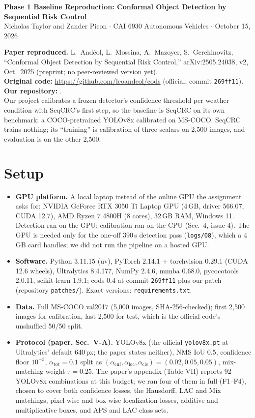 \documentclass[10pt]{article}
\begin{document}
\begin{center}
{\large\bfseries Phase 1 Baseline Reproduction: Conformal Object Detection by Sequential Risk Control}\\[1pt]
Nicholas Taylor and Zander Picon \;$\cdot$\; CAI 6930 Autonomous Vehicles \;$\cdot$\; October 15, 2026
\end{center}
\vspace{-6pt}
\textbf{Paper reproduced.} L.~And\'eol, L.~Mossina, A.~Mazoyer, S.~Gerchinovitz, ``Conformal Object Detection by
Sequential Risk Control,'' arXiv:2505.24038, v2, Oct.\ 2025 (preprint; no peer-reviewed version yet).\\
\textbf{Original code:} \url{https://github.com/leoandeol/cods} (official; commit \texttt{269ff11}).
\textbf{Our repository:} \repourl.\\
Our project calibrates a frozen detector's confidence threshold per weather condition with SeqCRC's first step, so
the baseline is SeqCRC on its own benchmark: a COCO-pretrained YOLOv8x calibrated on MS-COCO. SeqCRC trains nothing;
its ``training'' is calibration of three scalars on 2,500 images, and evaluation is on the other 2,500.

\section{Setup}
\begin{itemize}
\item \textbf{GPU platform.} A local laptop instead of the online GPU the assignment asks for: NVIDIA GeForce RTX 3050 Ti Laptop GPU (4\,GB,
driver 566.07, CUDA 12.7), AMD Ryzen 7 4800H (8 cores), 32\,GB RAM, Windows 11. Detection ran on the GPU; calibration
ran on the CPU (Sec.~4, issue 4). The GPU is needed only for the one-off 390\,s detection pass (\texttt{logs/08}), which a
4\,GB card handles; we did not run the pipeline on a hosted GPU.
\item \textbf{Software.} Python 3.11.15 (uv), PyTorch 2.14.1 + torchvision 0.29.1 (CUDA 12.6 wheels), Ultralytics
8.4.177, NumPy 2.4.6, numba 0.68.0, pycocotools 2.0.11, scikit-learn 1.9.1; cods 0.4 at commit \texttt{269ff11} plus
our patch (repository \texttt{patches/}). Exact versions: \texttt{requirements.txt}.
\item \textbf{Data.} Full MS-COCO val2017 (5,000 images, SHA-256-checked); first 2,500 images for calibration,
last 2,500 for test, which is the official code's unshuffled 50/50 split.
\item \textbf{Protocol (paper, Sec.~V-A).} YOLOv8x (the official \texttt{yolov8x.pt} at Ultralytics' default 640\,px; the
paper states neither), NMS IoU 0.5, confidence floor
$10^{-3}$, $\alpha_{\text{tot}}=0.1$ split as $(\alpha_{\text{cnf}},\alpha_{\text{loc}},\alpha_{\text{cls}})=(0.02,0.05,0.05)$,
mix-matching weight $\tau=0.25$. The paper's appendix (Table VII) reports 92 YOLOv8x combinations at this budget; we ran four of
them in full (F1--F4), chosen to cover both confidence losses, the Hausdorff, LAC and Mix matchings, pixel-wise and
box-wise localization losses, additive and multiplicative boxes, and APS and LAC class sets.
\end{itemize}
\end{document}
